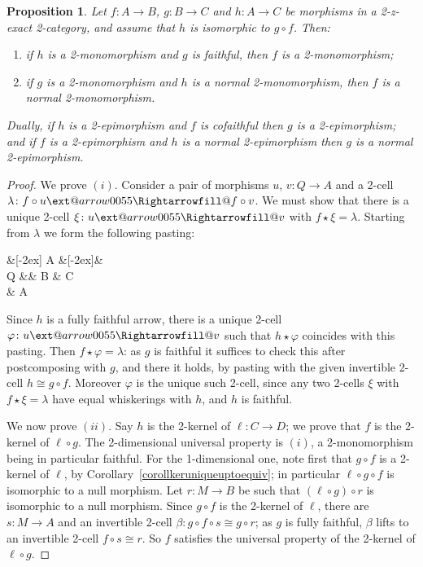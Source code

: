 \documentclass[reqno,a4paper]{amsart}
\makeatletter
\numberwithin{equation}{section}
\theoremstyle{plain}
\newtheorem{proposition}[subsection]{Proposition}
\theoremstyle{definition}
\newenvironment{enumT}{\begin{enumerate}[label=\((\)\hspace{-0.1ex}\roman*\hspace{0.13ex}\()\)]}{\end{enumerate}}
\def\nameit#1{\textrm{#1}~}
\def\corx{\nameit{Corollary}}
\newcommand{\comp}{\circ}
\newcommand{\iso}{\cong}
\def\phi{\varphi}
\renewcommand{\1}{\onecat{1}}
\newcommand{\aR}[2][]{%
	\ext@arrow 0055{\Rightarrowfill@}{#1}{#2}}
\makeatother
\begin{document}
\begin{proposition}\label{Composites of Normal Monos}
	Let \(f\colon A\to B\), \(g\colon B\to C\) and \(h\colon A\to C\) be morphisms in a 2-z-exact 2-category, and assume that \(h\) is isomorphic to \(g\comp f\). Then:
	\begin{enumT}
		\item if \(h\) is a 2-monomorphism and \(g\) is faithful, then \(f\) is a 2-monomorphism;
		\item if \(g\) is a 2-monomorphism and \(h\) is a normal 2-monomorphism, then \(f\) is a normal 2-monomorphism.
	\end{enumT}
	Dually, if \(h\) is a 2-epimorphism and \(f\) is cofaithful then \(g\) is a 2-epimorphism; and if \(f\) is a 2-epimorphism and \(h\) is a normal 2-epimorphism then \(g\) is a normal 2-epimorphism.
\end{proposition}
\begin{proof}
	We prove \((i)\). Consider a pair of morphisms \(u\), \(v\colon Q\to A\) and a 2-cell \(\lambda\colon f\comp u\aR{}f\comp v\). We must show that there is a unique 2-cell \(\xi\colon u\aR{}v\) with \(f\star\xi=\lambda\). Starting from \(\lambda\) we form the following pasting:
	\begin{cd}[2]
		\&[-2ex] A \&[-2ex]\& \\
		Q \&\& B \& C \\
		\& A
		\arrow["f", from=1-2, to=2-3]
		\arrow["h",bend left, from=1-2, to=2-4]
		\arrow["\lambda"', Rightarrow, from=1-2, to=3-2, shorten <=2ex, shorten >=2ex]
		\arrow["u", from=2-1, to=1-2]
		\arrow["v"', from=2-1, to=3-2]
		\arrow["g", from=2-3, to=2-4]
		\arrow[shift right=5,xshift=-2ex, iso, from=2-3, to=2-4]
		\arrow[shift left=5,xshift=-2ex, iso, from=2-3, to=2-4]
		\arrow["f"', from=3-2, to=2-3]
		\arrow["h"',bend right, from=3-2, to=2-4]
	\end{cd}
	Since \(h\) is a fully faithful arrow, there is a unique 2-cell \(\phi\colon u\aR{}v\) such that \(h\star\phi\) coincides with this pasting. Then \(f\star\phi=\lambda\): as \(g\) is faithful it suffices to check this after postcomposing with \(g\), and there it holds, by pasting with the given invertible 2-cell \(h\iso g\comp f\). Moreover \(\phi\) is the unique such 2-cell, since any two 2-cells \(\xi\) with \(f\star\xi=\lambda\) have equal whiskerings with \(h\), and \(h\) is faithful.

	We now prove \((ii)\). Say \(h\) is the 2-kernel of \(\ell\colon C\to D\); we prove that \(f\) is the 2-kernel of \(\ell\comp g\). The 2-dimensional universal property is \((i)\), a 2-monomorphism being in particular faithful. For the 1-dimensional one, note first that \(g\comp f\) is a 2-kernel of \(\ell\), by \corx\ref{corollkeruniqueuptoequiv}; in particular \(\ell\comp g\comp f\) is isomorphic to a null morphism. Let \(r\colon M\to B\) be such that \((\ell\comp g)\comp r\) is isomorphic to a null morphism. Since \(g\comp f\) is the 2-kernel of \(\ell\), there are \(s\colon M\to A\) and an invertible 2-cell \(\beta\colon g\comp f\comp s\iso g\comp r\); as \(g\) is fully faithful, \(\beta\) lifts to an invertible 2-cell \(f\comp s\iso r\). So \(f\) satisfies the universal property of the 2-kernel of \(\ell\comp g\).
\end{proof}
\end{document}
